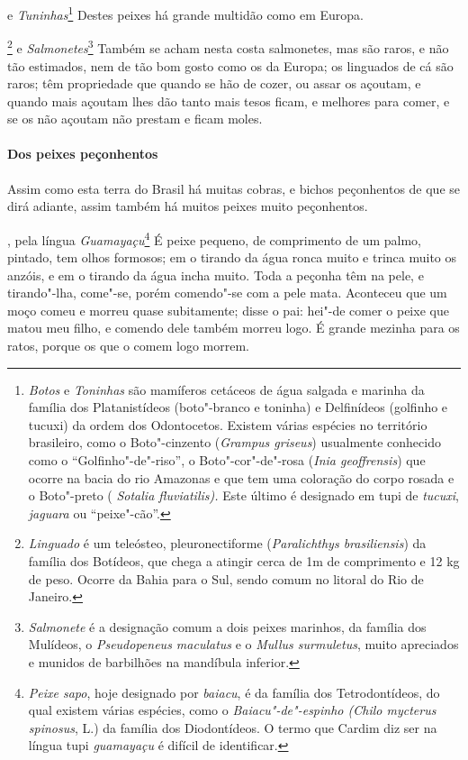  e \textit{Tuninhas}\footnote{ \textit{Botos} e 
\textit{Toninhas} são mamíferos cetáceos de água salgada e marinha da
família dos Platanistídeos (boto"-branco e toninha) e Delfinídeos
(golfinho e tucuxi) da ordem dos Odontocetos. Existem várias espécies
no território brasileiro, como o Boto"-cinzento (\textit{Grampus
griseus}) usualmente conhecido como o ``Golfinho"-de"-riso'', o
Boto"-cor"-de"-rosa (\textit{Inia geoffrensis}) que ocorre na bacia do
rio Amazonas e que tem uma coloração do corpo rosada e o Boto"-preto (
\textit{Sotalia fluviatilis).} Este último é designado em tupi de
\textit{tucuxi}, \textit{jaguara} ou ``peixe"-cão''.} Destes
peixes há grande multidão como em Europa. 

\footnote{ \textit{Linguado} é um teleósteo,
pleuronectiforme (\textit{Paralichthys brasiliensis}) da família dos
Botídeos, que chega a atingir cerca de 1m de comprimento e
12 kg de peso. Ocorre da Bahia para o Sul, sendo comum no
litoral do Rio de Janeiro.} e \textit{Salmonetes}\footnote{ \textit{Salmonete} 
é a designação comum a dois peixes marinhos, da
família dos Mulídeos, o \textit{Pseudopeneus maculatus} e o
\textit{Mullus surmuletus}, muito apreciados e munidos de barbilhões na
mandíbula inferior.} Também se acham nesta costa
salmonetes, mas são raros, e não tão estimados, nem de tão bom gosto
como os da Europa; os linguados de cá são raros; têm propriedade que
quando se hão de cozer, ou assar os açoutam, e quando mais açoutam lhes
dão tanto mais tesos ficam, e melhores para comer, e se os não açoutam
não prestam e ficam moles.

\paragraph{Dos peixes peçonhentos}

Assim como esta terra do Brasil há muitas cobras, e bichos
peçonhentos de que se dirá adiante, assim também há muitos peixes muito
peçonhentos.

, pela língua \textit{Guamayaçu}\footnote{ \textit{Peixe sapo}, 
hoje designado por \textit{baiacu}, é da família
dos Tetrodontídeos, do qual existem várias espécies, como o
\textit{Baiacu"-de"-espinho (Chilo mycterus spinosus}, L.) da família dos
Diodontídeos. O termo que Cardim diz ser na língua tupi
\textit{guamayaçu} é difícil de identificar.} É peixe
pequeno, de comprimento de um palmo, pintado, tem olhos formosos; em o
tirando da água ronca muito e trinca muito os anzóis, e em o tirando da
água incha muito. Toda a peçonha têm na pele, e tirando"-lha, come"-se,
porém comendo"-se com a pele mata. Aconteceu que um moço comeu e morreu
quase subitamente; disse o pai: hei"-de comer o peixe que matou meu
filho, e comendo dele também morreu logo. É grande mezinha para os
ratos, porque os que o comem logo morrem.


